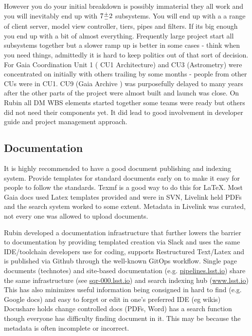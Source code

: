 \documentclass[11pt,twoside]{article}
\begin{document}
However you do your initial breakdown is possibly immaterial they all work and you will inevitably end up with $7 {{+}\over{-}} 2$ subsystems.
You will end up with a a range of client server, model view controller, tiers, pipes and filters.
If its big enough you end up with a bit of almost everything.
Frequently large project start all subsystems together but
a slower ramp up is better in some cases - think when you need things, admittedly it is  hard to keep politics out of that sort of decision.
For Gaia Coordination Unit 1 ( CU1 Architecture) and CU3 (Astrometry) were concentrated on initially with others trailing by some months - people from other CUs were in CU1.
CU9 (Gaia Archive ) was purposefully delayed to many years after the other parts of the project were almost built and launch was close.
On Rubin all DM WBS elements started together
some  teams were ready but others did not need their components  yet.
It did lead to good involvement in developer guide and project management approach.



\subsection{Documentation}
It is highly recommended to have  a good document publishing and indexing system.
Provide templates for standard documents early on to make it easy for people to follow the standards. Texmf is a good way to do this for \LaTeX.
Most Gaia docs used Latex templates provided and were in SVN,  Livelink held PDFs and the search system worked to some extent.
Metadata in Livelink was curated, not every one was allowed to upload documents.

Rubin developed a documentation infrastructure that further lowers the barrier to documentation by providing templated creation via Slack and uses the same IDE/toolchain developers use for coding, supports Restructured Text/Latex and is published via Github through the well-known GitOps workflow.
Single page documents (technotes) and site-based documentation (e.g. \url{ pipelines.lsst.io}) share the same infrastructure (see \url{sqr-000.lsst.io}) and search indexing hub (\url{www.lsst.io})
This has also minimizes useful information being consigned in hard to find (e.g. Google docs) and easy to forget or edit in one’s preferred IDE (eg wikis)
Docushare holds change controlled docs (PDFs, Word) has a search function though everyone has difficulty finding document in it.
This may be because the metadata is often incomplete or incorrect.
\end{document}
